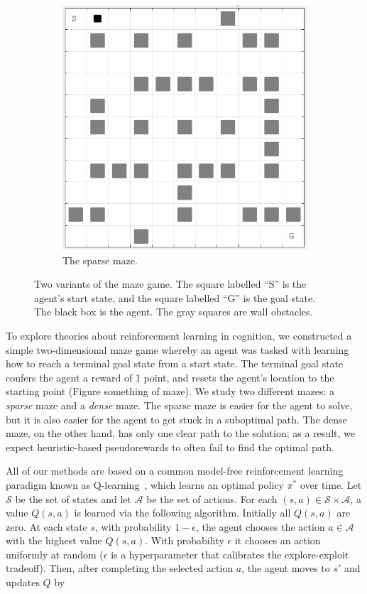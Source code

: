 \documentclass[notitlepage]{article}
\begin{document}
\begin{figure}
\begin{subfigure}{.4\textwidth}
  \includegraphics[width=.95\linewidth]{sparse_maze}
  \caption{The sparse maze.}
\end{subfigure}
\caption{Two variants of the maze game. The square labelled ``S'' is the agent's start state, and the square labelled ``G'' is the goal state. The black box is the agent. The gray squares are wall obstacles.}
\label{fig:mazes}
\end{figure}

To explore theories about reinforcement learning in cognition, we constructed a simple two-dimensional maze game whereby an agent was tasked with learning how to reach a terminal goal state from a start state. The terminal goal state confers the agent a reward of 1 point, and resets the agent's location to the starting point (Figure something of maze). We study two different mazes: a \textit{sparse} maze and a \textit{dense} maze. The sparse maze is easier for the agent to solve, but it is also easier for the agent to get stuck in a suboptimal path. The dense maze, on the other hand, has only one clear path to the solution; as a result, we expect heuristic-based pseudorewards to often fail to find the optimal path.

All of our methods are based on a common model-free reinforcement learning paradigm known as Q-learning~\cite{sutton1998reinforcement}, which learns an optimal policy $\pi^*$ over time. Let $\mathcal{S}$ be the set of states and let $\mathcal{A}$ be the set of actions. For each $(s,a) \in \mathcal{S} \times \mathcal{A}$, a value $Q(s,a)$ is learned via the following algorithm. Initially all $Q(s,a)$ are zero. At each state $s$, with probability $1 - \epsilon$, the agent chooses the action $a \in \mathcal{A}$ with the highest value $Q(s,a)$. With probability $\epsilon$ it chooses an action uniformly at random ($\epsilon$ is a hyperparameter that calibrates the explore-exploit tradeoff). Then, after completing the selected action $a$, the agent moves to $s'$ and updates $Q$ by
\end{document}
